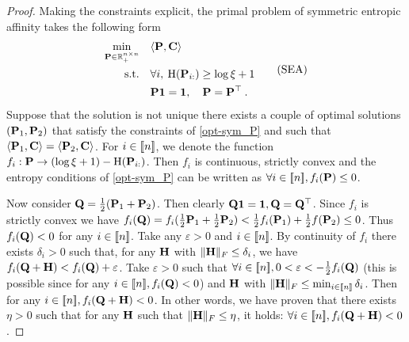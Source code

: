 \begin{proof}
Making the constraints explicit, the primal problem of symmetric entropic affinity takes the following form
\begin{equation}
\begin{aligned}
    \min_{{\mathbf{P}} \in \mathbb{R}_+^{n \times n}} \quad &\langle {\mathbf{P}}, \mathbf{C} \rangle \\
    \text{s.t.} \quad &\forall i, \: \operatorname{H}({\mathbf{P}}_{i:}) \geq \log{\xi} + 1 \\
    & {\mathbf{P}} \bm{1} = \bm{1}, \quad {\mathbf{P}} = {\mathbf{P}}^\top \:.
\end{aligned}
\tag{SEA}\label{opt-sym_P}
\end{equation}
Suppose that the solution is not unique \ie there exists a couple of optimal solutions $({\mathbf{P}}_1, {\mathbf{P}}_2)$ that satisfy the constraints of \eqref{opt-sym_P} and such that $\langle {\mathbf{P}}_1, \mathbf{C} \rangle=\langle {\mathbf{P}}_2, \mathbf{C} \rangle$. For $i \in {[\![n]\!]}$, we denote the function $f_{i}: {\mathbf{P}} \rightarrow (\log{\xi} + 1)-\operatorname{H}({\mathbf{P}}_{i:})$. Then  $f_i$ is continuous, strictly convex and the entropy conditions of  \eqref{opt-sym_P} can be written as $\forall i \in {[\![n]\!]}, f_{i}({\mathbf{P}}) \leq 0$. 

Now consider ${\mathbf{Q}} = \frac{1}{2} ({\mathbf{P}}_1 + {\mathbf{P}}_2)$. Then clearly ${\mathbf{Q}} \bm{1} = \bm{1}, {\mathbf{Q}} = {\mathbf{Q}}^\top$. Since $f_i$ is strictly convex we have $f_i({\mathbf{Q}}) = f_i(\frac{1}{2}{\mathbf{P}}_1+\frac{1}{2}{\mathbf{P}}_2) < \frac{1}{2} f_i({\mathbf{P}}_1) +\frac{1}{2} f({\mathbf{P}}_2) \leq 0$. Thus $f_i({\mathbf{Q}}) < 0$ for any $i \in {[\![n]\!]}$. Take any $\varepsilon >0$ and $i \in {[\![n]\!]}$. By continuity of $f_i$ there exists $\delta_i > 0$ such that, for any ${\mathbf{H}}$ with $\|{\mathbf{H}}\|_F \leq \delta_i$, we have $f_{i}({\mathbf{Q}}+{\mathbf{H}}) < f_{i}({\mathbf{Q}})+ \varepsilon$. Take $\varepsilon >0$ such that $\forall i \in {[\![n]\!]},  0 < \varepsilon < -\frac{1}{2} f_{i}({\mathbf{Q}})$ (this is possible since for any $i \in {[\![n]\!]}, f_{i}({\mathbf{Q}}) <0$) and ${\mathbf{H}}$ with $\|{\mathbf{H}}\|_F \leq \min_{i \in {[\![n]\!]}} \delta_i$. Then for any $i \in {[\![n]\!]}, f_{i}({\mathbf{Q}}+{\mathbf{H}}) < 0$. In other words, we have proven that there exists $\eta > 0$ such that for any ${\mathbf{H}}$ such that $\|{\mathbf{H}}\|_F \leq \eta$, it holds: $\forall i \in {[\![n]\!]}, f_i({\mathbf{Q}}+{\mathbf{H}}) < 0$.


\end{proof}
